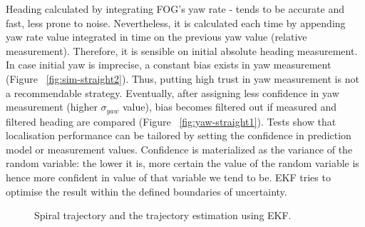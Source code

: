 Heading calculated by integrating FOG's yaw rate - tends to be accurate and fast, less prone to noise. Nevertheless, it is calculated each time by appending yaw rate value integrated in time on the previous yaw value (relative measurement). Therefore, it is sensible on initial absolute heading measurement. In case initial yaw is imprecise, a constant bias exists in yaw measurement (Figure ~\ref{fig:sim-straight2}). Thus, putting high trust in yaw measurement is not a recommendable strategy. Eventually, after assigning less confidence in yaw measurement (higher $\sigma_{yaw}$ value), bias becomes filtered out if measured and filtered heading are compared (Figure ~\ref{fig:yaw-straight1}).
Tests show that localisation performance can be tailored by setting the confidence in prediction model or measurement values. Confidence is materialized as the variance of the random variable: the lower it is, more certain the value of the random variable is hence more confident in value of that variable we tend to be. EKF tries to optimise the result within the defined boundaries of uncertainty.
\begin{figure}%
  \centering
    \caption{Spiral trajectory and the trajectory estimation using EKF.}
    \label{fig:spiral}
\vspace{-10pt}
\end{figure}

